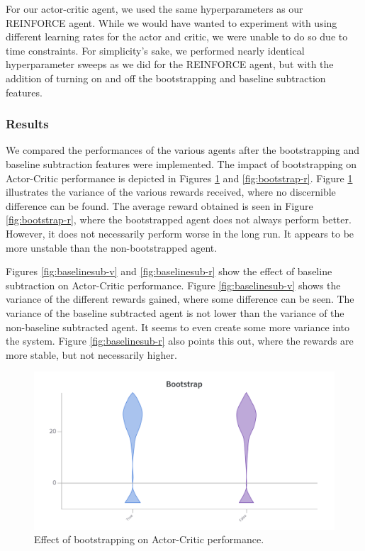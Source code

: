 \documentclass{article}
\begin{document}
For our actor-critic agent, we used the same hyperparameters as our REINFORCE agent.
While we would have wanted to experiment with using different learning rates for the actor and critic, we were unable to do so due to time constraints.
For simplicity's sake, we performed nearly identical hyperparameter sweeps as we did for the REINFORCE agent, but with the addition of turning on and off the bootstrapping and baseline subtraction features.

\subsubsection{Results}
\label{AC-Results}

We compared the performances of the various agents after the bootstrapping and baseline subtraction features were implemented.
The impact of bootstrapping on Actor-Critic performance is depicted in Figures \ref{fig:bootstrap-v} and \ref{fig:bootstrap-r}.
Figure \ref{fig:bootstrap-v} illustrates the variance of the various rewards received, where no discernible difference can be found.
The average reward obtained is seen in Figure \ref{fig:bootstrap-r}, where the bootstrapped agent does not always perform better.
However, it does not necessarily perform worse in the long run. It appears to be more unstable than the non-bootstrapped agent.

Figures \ref{fig:baselinesub-v} and \ref{fig:baselinesub-r} show the effect of baseline subtraction on Actor-Critic performance.
Figure \ref{fig:baselinesub-v} shows the variance of the different rewards gained, where some difference can be seen.
The variance of the baseline subtracted agent is not lower than the variance of the non-baseline subtracted agent.
It seems to even create some more variance into the system.
Figure \ref{fig:baselinesub-r} also points this out, where the rewards are more stable, but not necessarily higher.

\begin{figure}[htbp]
    \centering
    \includegraphics[width=\linewidth]{figs/bootstrap-V.png}
    \caption{Effect of bootstrapping on Actor-Critic performance.}
    \label{fig:bootstrap-v}
\end{figure}
\end{document}
